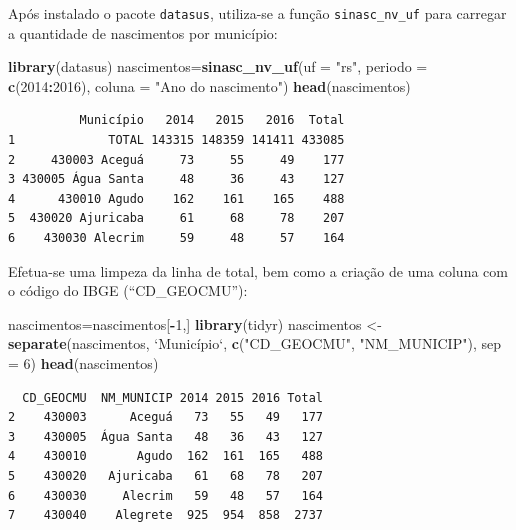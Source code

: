 \documentclass[12pt,brazil,oneside]{book}
\newenvironment{Shaded}{\begin{snugshade}}{\end{snugshade}}
\newcommand{\DataTypeTok}[1]{\textcolor[rgb]{0.13,0.29,0.53}{#1}}
\newcommand{\DecValTok}[1]{\textcolor[rgb]{0.00,0.00,0.81}{#1}}
\newcommand{\KeywordTok}[1]{\textcolor[rgb]{0.13,0.29,0.53}{\textbf{#1}}}
\newcommand{\NormalTok}[1]{#1}
\newcommand{\OperatorTok}[1]{\textcolor[rgb]{0.81,0.36,0.00}{\textbf{#1}}}
\newcommand{\StringTok}[1]{\textcolor[rgb]{0.31,0.60,0.02}{#1}}
\begin{document}
Após instalado o pacote \texttt{datasus}, utiliza-se a função \texttt{sinasc\_nv\_uf} para carregar a quantidade de nascimentos por município:

\begin{Shaded}
\begin{Highlighting}[]
\KeywordTok{library}\NormalTok{(datasus)}
\NormalTok{nascimentos=}\KeywordTok{sinasc_nv_uf}\NormalTok{(}\DataTypeTok{uf =} \StringTok{"rs"}\NormalTok{,}
             \DataTypeTok{periodo =} \KeywordTok{c}\NormalTok{(}\DecValTok{2014}\OperatorTok{:}\DecValTok{2016}\NormalTok{),}
             \DataTypeTok{coluna =} \StringTok{"Ano do nascimento"}\NormalTok{)}
\KeywordTok{head}\NormalTok{(nascimentos)}
\end{Highlighting}
\end{Shaded}

\begin{verbatim}
          Município   2014   2015   2016  Total
1             TOTAL 143315 148359 141411 433085
2     430003 Aceguá     73     55     49    177
3 430005 Água Santa     48     36     43    127
4      430010 Agudo    162    161    165    488
5  430020 Ajuricaba     61     68     78    207
6    430030 Alecrim     59     48     57    164
\end{verbatim}

Efetua-se uma limpeza da linha de total, bem como a criação de uma coluna com o código do IBGE (``CD\_GEOCMU''):

\begin{Shaded}
\begin{Highlighting}[]
\NormalTok{nascimentos=nascimentos[}\OperatorTok{-}\DecValTok{1}\NormalTok{,]}
\KeywordTok{library}\NormalTok{(tidyr)}
\NormalTok{nascimentos <-}\StringTok{ }\KeywordTok{separate}\NormalTok{(nascimentos, }\StringTok{`}\DataTypeTok{Município}\StringTok{`}\NormalTok{, }\KeywordTok{c}\NormalTok{(}\StringTok{"CD_GEOCMU"}\NormalTok{, }\StringTok{"NM_MUNICIP"}\NormalTok{), }\DataTypeTok{sep =} \DecValTok{6}\NormalTok{)}
\KeywordTok{head}\NormalTok{(nascimentos)}
\end{Highlighting}
\end{Shaded}

\begin{verbatim}
  CD_GEOCMU  NM_MUNICIP 2014 2015 2016 Total
2    430003      Aceguá   73   55   49   177
3    430005  Água Santa   48   36   43   127
4    430010       Agudo  162  161  165   488
5    430020   Ajuricaba   61   68   78   207
6    430030     Alecrim   59   48   57   164
7    430040    Alegrete  925  954  858  2737
\end{verbatim}
\end{document}
